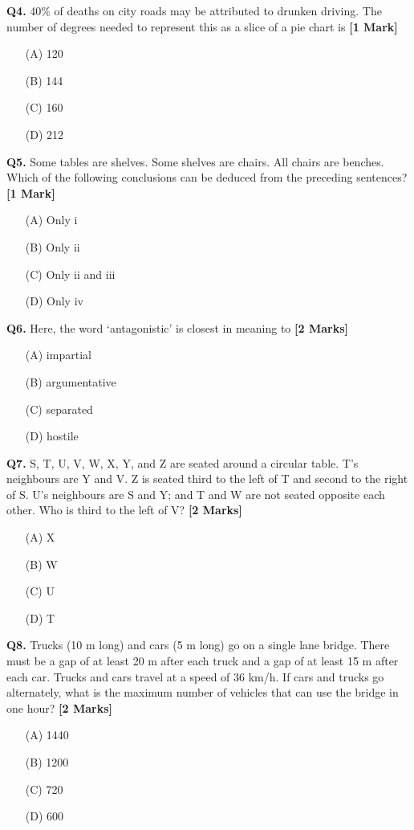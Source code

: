 \documentclass[11pt]{article}
\newcommand{\questiona}[2]{
    \noindent\textbf{Q#2.} #1 \hfill \textbf{[1 Mark]}
}
\newcommand{\questionb}[2]{
    \noindent\textbf{Q#2.} #1 \hfill \textbf{[2 Marks]}
}
\begin{document}
\questiona{40\% of deaths on city roads may be attributed to drunken driving. The number of degrees needed to represent this as a slice of a pie chart is}{4}
\begin{enumerate}
    \item[(A)] 120  
    \item[(B)] 144  
    \item[(C)] 160  
    \item[(D)] 212  
\end{enumerate}
\vspace{0.5cm}

\questiona{Some tables are shelves. Some shelves are chairs. All chairs are benches. Which of the following conclusions can be deduced from the preceding sentences?}{5}
\begin{enumerate}
    \item[(A)] Only i  
    \item[(B)] Only ii  
    \item[(C)] Only ii and iii  
    \item[(D)] Only iv  
\end{enumerate}
\vspace{0.5cm}

\questionb{Here, the word ‘antagonistic’ is closest in meaning to}{6}
\begin{enumerate}
    \item[(A)] impartial  
    \item[(B)] argumentative  
    \item[(C)] separated  
    \item[(D)] hostile  
\end{enumerate}
\vspace{0.5cm}

\questionb{S, T, U, V, W, X, Y, and Z are seated around a circular table. T's neighbours are Y and V. Z is seated third to the left of T and second to the right of S. U’s neighbours are S and Y; and T and W are not seated opposite each other. Who is third to the left of V?}{7}
\begin{enumerate}
    \item[(A)] X  
    \item[(B)] W  
    \item[(C)] U  
    \item[(D)] T  
\end{enumerate}
\vspace{0.5cm}

\questionb{Trucks (10 m long) and cars (5 m long) go on a single lane bridge. There must be a gap of at least 20 m after each truck and a gap of at least 15 m after each car. Trucks and cars travel at a speed of 36 km/h. If cars and trucks go alternately, what is the maximum number of vehicles that can use the bridge in one hour?}{8}
\begin{enumerate}
    \item[(A)] 1440  
    \item[(B)] 1200  
    \item[(C)] 720  
    \item[(D)] 600  
\end{enumerate}
\vspace{0.5cm}
\end{document}
